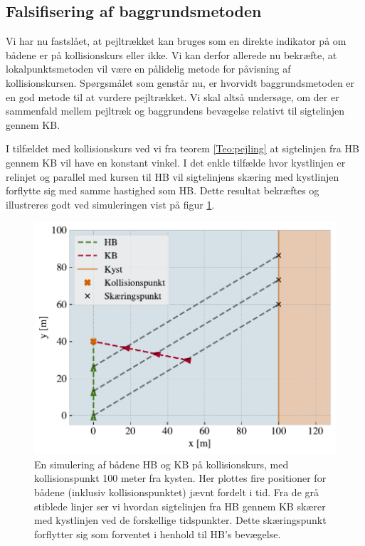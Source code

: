 \documentclass[%
 reprint,
nofootinbib,
aps,
]{revtex4-1}
\begin{document}
\subsection{Falsifisering af baggrundsmetoden}
Vi har nu fastslået, at pejltrækket kan bruges som en direkte indikator på om bådene er på kollisionskurs eller ikke. Vi kan derfor allerede nu bekræfte, at lokalpunktsmetoden vil være en pålidelig metode for påvisning af kollisionskursen. Spørgsmålet som genstår nu, er hvorvidt baggrundsmetoden er en god metode til at vurdere pejltrækket. Vi skal altså undersøge, om der er sammenfald mellem pejltræk og baggrundens bevægelse relativt til sigtelinjen gennem KB. \par
I tilfældet med kollisionskurs ved vi fra teorem \ref{Teo:pejling} at sigtelinjen fra HB gennem KB vil have en konstant vinkel. I det enkle tilfælde hvor kystlinjen er relinjet og parallel med kursen til HB vil sigtelinjens skæring med kystlinjen forflytte sig med samme hastighed som HB. Dette resultat bekræftes og illustreres godt ved simuleringen vist på figur \ref{fig:eks1}.
\begin{figure}[H]
 \includegraphics[width=\linewidth]{figures/eksempel1.pdf}
 \caption{En simulering af bådene HB og KB på kollisionskurs, med kollisionspunkt 100 meter fra kysten. Her plottes fire positioner for bådene (inklusiv kollisionspunktet) jævnt fordelt i tid. Fra de grå stiblede linjer ser vi hvordan sigtelinjen fra HB gennem KB skærer med kystlinjen ved de forskellige tidspunkter. Dette skæringspunkt forflytter sig som forventet i henhold til HB's bevægelse.}
 \label{fig:eks1}
\end{figure}
\end{document}
